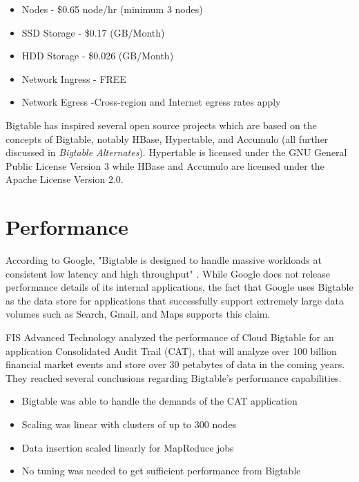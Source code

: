 \documentclass[9pt,twocolumn,twoside]{styles/osajnl}
\begin{document}
\vspace{-\topsep}
\begin{itemize}
\item Nodes - \$0.65 node/hr (minimum 3 nodes) 
\item SSD Storage -  \$0.17 (GB/Month)  
\item HDD Storage - \$0.026 (GB/Month) 
\item Network Ingress - FREE 
\item Network Egress -Cross-region and Internet egress rates apply  
\end{itemize}
\vspace{-\topsep}


Bigtable has inspired several open source projects which are based on the concepts of Bigtable, notably HBase, Hypertable, and Accumulo (all further discussed in \emph{Bigtable Alternates}). Hypertable is licensed under the GNU General Public License Version 3 while HBase and Accumulo are licensed under the Apache License Version 2.0.


\section{Performance}

According to Google, "Bigtable is designed to handle massive workloads at consistent low latency and high throughput" \cite{www-cloudbigtable}.  While Google does not release performance details of its internal applications, the fact that Google uses Bigtable as the data store for applications that successfully support extremely large data volumes such as Search, Gmail, and Maps supports this claim.

FIS Advanced Technology analyzed the performance of Cloud Bigtable for an application Consolidated Audit Trail (CAT), that will analyze over 100 billion financial market events and store over 30 petabytes of data in the coming years.  They reached several conclusions regarding Bigtable's performance capabilities.
\vspace{-\topsep}
\begin{itemize}
\item Bigtable was able to handle the demands of the CAT application 
\item Scaling was linear with clusters of up to 300 nodes 
\item Data insertion scaled linearly for MapReduce jobs 
\item No tuning was needed to get sufficient performance from Bigtable
\end{itemize}
\vspace{-\topsep}
\end{document}
